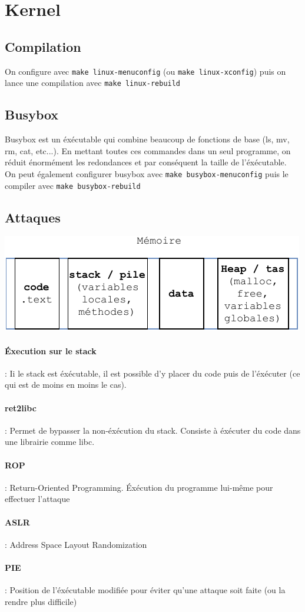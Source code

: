 \documentclass[resume]{subfiles}
\begin{document}
\section{Kernel}
\subsection{Compilation}
On configure avec \verb!make linux-menuconfig! (ou \verb!make linux-xconfig!) puis on lance une compilation avec \verb!make linux-rebuild!
\subsection{Busybox}
Busybox est un éxécutable qui combine beaucoup de fonctions de base (ls, mv, rm, cat, etc...). En mettant toutes ces commandes dans un seul programme, on réduit énormément les redondances et par conséquent la taille de l'éxécutable.\\
On peut également configurer busybox avec \verb!make busybox-menuconfig! puis le compiler avec \verb!make busybox-rebuild!
\subsection{Attaques}
\begin{center}
\includegraphics[scale=1,page=1]{Schemas-crop.pdf}
\end{center}
\paragraph{Éxecution sur le stack} : Ii le stack est éxécutable, il est possible d'y placer du code puis de l'éxécuter (ce qui est de moins en moins le cas).
\paragraph{ret2libc} : Permet de bypasser la non-éxécution du stack. Consiste à éxécuter du code dans une librairie comme libc.
\paragraph{ROP} : Return-Oriented Programming. Éxécution du programme lui-même pour effectuer l'attaque
\paragraph{ASLR} : Address Space Layout Randomization
\paragraph{PIE} : Position de l'éxécutable modifiée pour éviter qu'une attaque soit faite (ou la rendre plus difficile)
\end{document}
